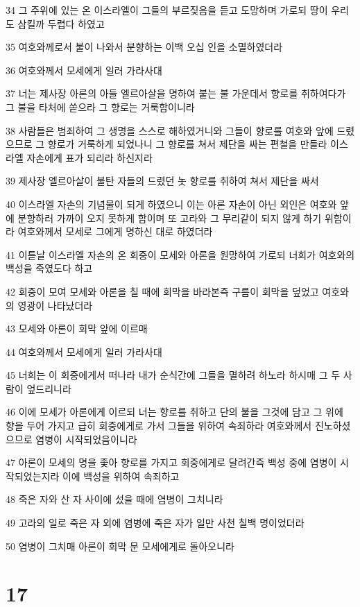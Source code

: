\par 34 그 주위에 있는 온 이스라엘이 그들의 부르짖음을 듣고 도망하며 가로되 땅이 우리도 삼킬까 두렵다 하였고
\par 35 여호와께로서 불이 나와서 분향하는 이백 오십 인을 소멸하였더라
\par 36 여호와께서 모세에게 일러 가라사대
\par 37 너는 제사장 아론의 아들 엘르아살을 명하여 붙는 불 가운데서 향로를 취하여다가 그 불을 타처에 쏟으라 그 향로는 거룩함이니라
\par 38 사람들은 범죄하여 그 생명을 스스로 해하였거니와 그들이 향로를 여호와 앞에 드렸으므로 그 향로가 거룩하게 되었나니 그 향로를 쳐서 제단을 싸는 편철을 만들라 이스라엘 자손에게 표가 되리라 하신지라
\par 39 제사장 엘르아살이 불탄 자들의 드렸던 놋 향로를 취하여 쳐서 제단을 싸서
\par 40 이스라엘 자손의 기념물이 되게 하였으니 이는 아론 자손이 아닌 외인은 여호와 앞에 분향하러 가까이 오지 못하게 함이며 또 고라와 그 무리같이 되지 않게 하기 위함이라 여호와께서 모세로 그에게 명하신 대로 하였더라
\par 41 이튿날 이스라엘 자손의 온 회중이 모세와 아론을 원망하여 가로되 너희가 여호와의 백성을 죽였도다 하고
\par 42 회중이 모여 모세와 아론을 칠 때에 회막을 바라본즉 구름이 회막을 덮었고 여호와의 영광이 나타났더라
\par 43 모세와 아론이 회막 앞에 이르매
\par 44 여호와께서 모세에게 일러 가라사대
\par 45 너희는 이 회중에게서 떠나라 내가 순식간에 그들을 멸하려 하노라 하시매 그 두 사람이 엎드리니라
\par 46 이에 모세가 아론에게 이르되 너는 향로를 취하고 단의 불을 그것에 담고 그 위에 향을 두어 가지고 급히 회중에게로 가서 그들을 위하여 속죄하라 여호와께서 진노하셨으므로 염병이 시작되었음이니라
\par 47 아론이 모세의 명을 좇아 향로를 가지고 회중에게로 달려간즉 백성 중에 염병이 시작되었는지라 이에 백성을 위하여 속죄하고
\par 48 죽은 자와 산 자 사이에 섰을 때에 염병이 그치니라
\par 49 고라의 일로 죽은 자 외에 염병에 죽은 자가 일만 사천 칠백 명이었더라
\par 50 염병이 그치매 아론이 회막 문 모세에게로 돌아오니라

\chapter{17}

